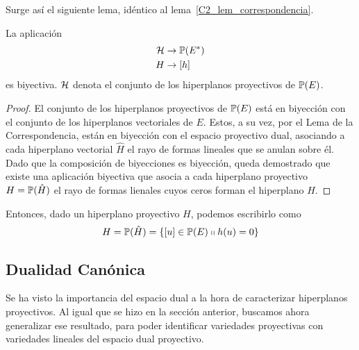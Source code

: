 Surge así el siguiente lema, idéntico al lema~\ref{C2_lem_correspondencia}.
\begin{lem}
	\label{C2_lem_correspondenciaProy}
	La aplicación
	\begin{equation*}
		\begin{split}
			\mathcal{H}& \rightarrow \mathbb{P}(E^*)\\
			H &\rightarrow [h]
		\end{split}
	\end{equation*}
	es biyectiva. $\mathcal{H}$ denota el conjunto de los hiperplanos proyectivos de $\mathbb{P}(E)$.
\end{lem}
\begin{proof}
	El conjunto de los hiperplanos proyectivos de $\mathbb{P}(E)$ está en biyección con el conjunto de los hiperplanos vectoriales de $E$. Estos, a su vez, por el Lema de la Correspondencia, están en biyección con el espacio proyectivo dual, asociando a cada hiperplano vectorial $\hat{H}$ el rayo de formas lineales que se anulan sobre él. Dado que la composición de biyecciones es biyección, queda demostrado que existe una aplicación biyectiva que asocia a cada hiperplano proyectivo $H=\mathbb{P}(\hat{H})$ el rayo de formas lienales cuyos ceros forman el hiperplano  $\hat{H}$.
\end{proof}
Entonces, dado un hiperplano proyectivo $H$, podemos escribirlo como
\begin{equation}
H=\mathbb{P}(\hat{H})=\{[u]\in\mathbb{P}(E)\shortparallel h(u)=0\}
\end{equation}

\subsection{Dualidad Canónica}
Se ha visto la importancia del espacio dual a la hora de caracterizar hiperplanos proyectivos. Al igual que se hizo en la sección anterior, buscamos ahora generalizar ese resultado, para poder identificar variedades proyectivas con variedades lineales del espacio dual proyectivo.

